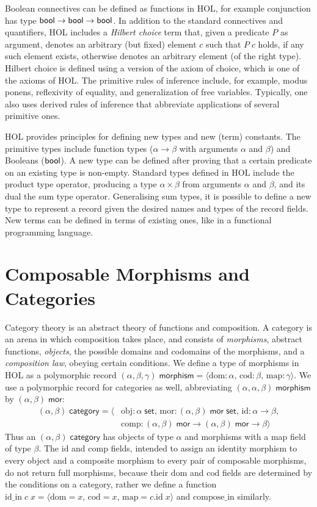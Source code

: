 \documentclass[twoside,titlepage,11pt]{article}
\begin{document}
Boolean connectives can be defined as functions in HOL, for example conjunction has type $\mathsf{bool}\to\mathsf{bool}\to\mathsf{bool}$.
In addition to the standard connectives and quantifiers, HOL includes a \emph{Hilbert choice} term that, given a predicate $P$ as argument, denotes an arbitrary (but fixed) element $c$ such that $P\; c$ holds, if any such element exists, otherwise denotes an arbitrary element (of the right type).
Hilbert choice is defined using a version of the axiom of choice, which is one of the axioms of HOL.
The primitive rules of inference include, for example, modus ponens, reflexivity of equality, and generalization of free variables.
Typically, one also uses derived rules of inference that abbreviate applications of several primitive ones.

HOL provides principles for defining new types and new (term) constants.
The primitive types include function types ($\alpha\to\beta$ with arguments $\alpha$ and $\beta$) and Booleans ($\mathsf{bool}$).
A new type can be defined after proving that a certain predicate on an existing type is non-empty.
Standard types defined in HOL include the product type operator, producing a type $\alpha\times\beta$ from arguments $\alpha$ and $\beta$, and its dual the sum type operator.
Generalising sum types, it is possible to define a new type to represent a record given the desired names and types of the record fields.
New terms can be defined in terms of existing ones, like in a functional programming language.
\section{Composable Morphisms and Categories}%
Category theory is an abstract theory of functions and composition.
A category is an arena in which composition takes place, and consists of \emph{morphisms}, abstract functions, \emph{objects}, the possible domains and codomains of the morphisms, and a \emph{composition law}, obeying certain conditions.
We define a type of morphisms in HOL as a polymorphic record $(\alpha,\beta,\gamma)\;\mathsf{morphism}=\langle\mathrm{dom}:\alpha,\,\mathrm{cod}:\beta,\,\mathrm{map}:\gamma\rangle$.
We use a polymorphic record for categories as well, abbreviating $(\alpha,\alpha,\beta)\;\mathsf{morphism}$ by $(\alpha,\beta)\;\mathsf{mor}$:
\begin{align*}
(\alpha,\beta)\;\mathsf{category}=\langle&\mathrm{obj}:\alpha\;\mathsf{set},\,\mathrm{mor}:(\alpha,\beta)\;\mathsf{mor}\;\mathsf{set},\,\mathrm{id}:\alpha\to\beta,\\&\mathrm{comp}:(\alpha,\beta)\;\mathsf{mor}\to(\alpha,\beta)\;\mathsf{mor}\to\beta\rangle
\end{align*}
Thus an $(\alpha,\beta)\;\mathsf{category}$ has objects of type $\alpha$ and morphisms with a map field of type $\beta$.
The $\mathrm{id}$ and $\mathrm{comp}$ fields, intended to assign an identity morphism to every object and a composite morphism to every pair of composable morphisms, do not return full morphisms, because their $\mathrm{dom}$ and $\mathrm{cod}$ fields are determined by the conditions on a category, rather we define a function $\mathrm{id\_in}\;c\;x=\langle\mathrm{dom}=x,\,\mathrm{cod}=x,\,\mathrm{map}=c.\mathrm{id}\;x\rangle$ and $\mathrm{compose\_in}$ similarly.
\end{document}
